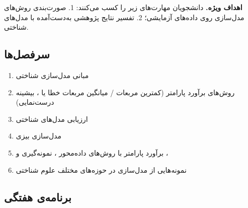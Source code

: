 \textbf{اهداف ویژه.} دانشجویان مهارت‌های زیر را کسب می‌کنند: 1. صورت‌بندی
روش‌های مدل‌سازی روی داده‌های آزمایشی؛ 2. تفسیر نتایج پژوهشی به‌دست‌آمده با
مدل‌های شناختی.

\subsection{سرفصل‌ها}

\begin{enumerate}
\def\labelenumi{\arabic{enumi}.}
\tightlist
\item
  مبانی مدل‌سازی شناختی
\item
  روش‌های برآورد پارامتر (کمترین مربعات / میانگین مربعات خطا یا ،
  بیشینه درست‌نمایی)
\item
  ارزیابی مدل‌های شناختی
\item
  مدل‌سازی بیزی
\item
  برآورد پارامتر با روش‌های داده‌محور ، نمونه‌گیری
   و ، 
\item
  نمونه‌هایی از مدل‌سازی در حوزه‌های مختلف علوم شناختی
\end{enumerate}

\subsection{برنامه‌ی هفتگی}

